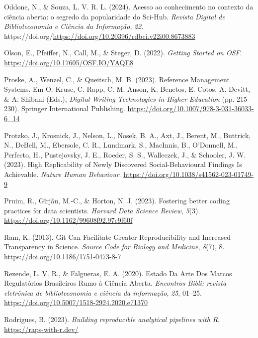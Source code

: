 \documentclass[
  a4paper,
]{book}
\newlength{\cslhangindent}
\newenvironment{CSLReferences}[2] %
 {\begin{list}{}{%
  \setlength{\itemindent}{0pt}
  \setlength{\leftmargin}{0pt}
  \setlength{\parsep}{0pt}
  \ifodd #1
   \setlength{\leftmargin}{\cslhangindent}
   \setlength{\itemindent}{-1\cslhangindent}
  \fi
  \setlength{\itemsep}{#2\baselineskip}}}
 {\end{list}}
\begin{document}
\begin{CSLReferences}{1}{0}
Oddone, N., \& Souza, L. V. R. L. (2024). Acesso ao conhecimento no
contexto da ciência aberta: o segredo da popularidade do Sci-Hub.
\emph{Revista Digital de Biblioteconomia e Ciência da Informação},
\emph{22}.
https://doi.org/\url{https://doi.org/10.20396/rdbci.v22i00.8673883}

Olson, E., Pfeiffer, N., Call, M., \& Steger, D. (2022). \emph{Getting
Started on OSF}. \url{https://doi.org/10.17605/OSF.IO/YAQE8}

Proske, A., Wenzel, C., \& Queitsch, M. B. (2023). Reference Management
Systems. Em O. Kruse, C. Rapp, C. M. Anson, K. Benetos, E. Cotos, A.
Devitt, \& A. Shibani (Eds.), \emph{Digital Writing Technologies in
Higher Education} (pp. 215--230). Springer International Publishing.
\url{https://doi.org/10.1007/978-3-031-36033-6_14}

Protzko, J., Krosnick, J., Nelson, L., Nosek, B. A., Axt, J., Berent,
M., Buttrick, N., DeBell, M., Ebersole, C. R., Lundmark, S., MacInnis,
B., O'Donnell, M., Perfecto, H., Pustejovsky, J. E., Roeder, S. S.,
Walleczek, J., \& Schooler, J. W. (2023). High Replicability of Newly
Discovered Social-Behavioural Findings Is Achievable. \emph{Nature Human
Behaviour}. \url{https://doi.org/10.1038/s41562-023-01749-9}

Pruim, R., Gîrjău, M.-C., \& Horton, N. J. (2023). Fostering better
coding practices for data scientists. \emph{Harvard Data Science
Review}, \emph{5}(3). \url{https://doi.org/10.1162/99608f92.97c9f60f}

Ram, K. (2013). Git Can Facilitate Greater Reproducibility and Increased
Transparency in Science. \emph{Source Code for Biology and Medicine},
\emph{8}(7), 8. \url{https://doi.org/10.1186/1751-0473-8-7}

Rezende, L. V. R., \& Falgueras, E. A. (2020). Estado Da Arte Dos Marcos
Regulat{ó}rios Brasileiros Rumo {à} {Ci{ê}ncia Aberta}. \emph{Encontros
Bibli: revista eletr{ô}nica de biblioteconomia e ci{ê}ncia da
informa{ç}{ã}o}, \emph{25}, 01--25.
\url{https://doi.org/10.5007/1518-2924.2020.e71370}

Rodrigues, B. (2023). \emph{Building reproducible analytical pipelines
with R}. \url{https://raps-with-r.dev/}


\end{CSLReferences}
\end{document}
